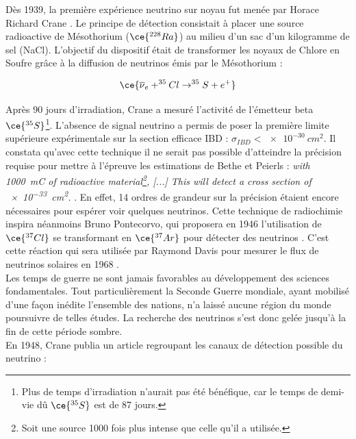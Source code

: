Dès 1939, la première expérience neutrino sur noyau fut menée par Horace Richard Crane \cite{Crane:1939vya}. Le principe de détection consistait à placer une source radioactive de Mésothorium ($\ce{^{228}Ra}$) au milieu d'un sac d'un kilogramme de sel (NaCl). L'objectif du dispositif était de transformer les noyaux de Chlore en Soufre grâce à la diffusion de neutrinos émis par le Mésothorium :

\begin{equation}
    \ce{\overline{\nu}_e + ^{35}Cl \rightarrow ^{35}S + e^+}
\end{equation}

\bigbreak

Après 90 jours d'irradiation, Crane a mesuré l'activité de l'émetteur beta $\ce{^{35}S}$\footnote{Plus de temps d'irradiation n'aurait pas été bénéfique, car le temps de demi-vie dû $\ce{^{35}S}$ est de 87 jours.}. L'absence de signal neutrino a permis de poser la première limite supérieure expérimentale sur la section efficace IBD : $\sigma_{IBD} < \SI{e-30}{cm^2}$. Il constata qu'avec cette technique il ne serait pas possible d'atteindre la précision requise pour mettre à l'épreuve les estimations de Bethe et Peierls : \og \textit{with \SI{1000}{mC} of radioactive material\footnote{Soit une source 1000 fois plus intense que celle qu'il a utilisée.}, [...] This will detect a cross section of \SI{e-33}{cm^2}.} \fg{} \cite{Crane:1939vya}. En effet, 14 ordres de grandeur sur la précision étaient encore nécessaires pour espérer voir quelques neutrinos. Cette technique de radiochimie inspira néanmoins Bruno Pontecorvo, qui proposera en 1946 l'utilisation de $\ce{^{37}Cl}$ se transformant en $\ce{^{37}Ar}$ pour détecter des neutrinos \cite{Davis:1955bi}. C'est cette réaction qui sera utilisée par Raymond Davis pour mesurer le flux de neutrinos solaires en 1968 \cite{Davis:1968cp}.\\

Les temps de guerre ne sont jamais favorables au développement des sciences fondamentales. Tout particulièrement la Seconde Guerre mondiale, ayant mobilisé d'une façon inédite l'ensemble des nations, n'a laissé aucune région du monde poursuivre de telles études. La recherche des neutrinos s'est donc gelée jusqu'à la fin de cette période sombre.\\

En 1948, Crane publia un article regroupant les canaux de détection possible du neutrino \cite{Crane:1948zz} :


